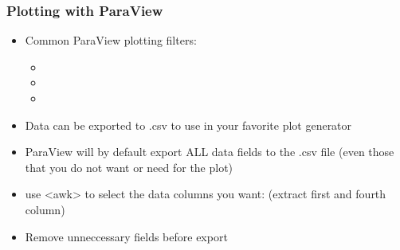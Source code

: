 \begin{frame}

  \frametitle{Plotting with ParaView}

  \begin{itemize}


      \item Common ParaView plotting filters:
      \begin{itemize}

        \item {} 

        \item {} 

        \item {} 

      \end{itemize}

    \item Data can be exported to .csv to use in your favorite plot generator 

    \item ParaView will by default export ALL data fields to the .csv file (even those that you do not want or need for the plot) 

    \item {} use <awk> to select the data columns you want:  (extract first and fourth column)

    \item {} Remove unneccessary fields before export %

  \end{itemize}

\end{frame}

